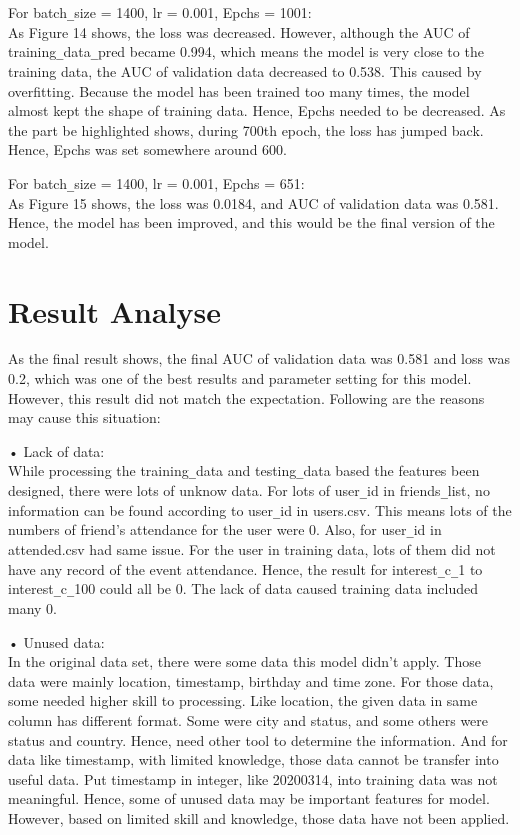 \documentclass{article}
\begin{document}
For batch\verb+_+size = 1400, lr = 0.001, Epchs = 1001:\\
As Figure 14 shows, the loss was decreased. However, although the AUC of training\verb+_+data\verb+_+pred became 0.994, which means the model is very close to the training data, the AUC of validation data decreased to 0.538. This caused by overfitting. Because the model has been trained too many times, the model almost kept the shape of training data. Hence, Epchs needed to be decreased. As the part be highlighted shows, during 700th epoch, the loss has jumped back. Hence, Epchs was set somewhere around 600.

For batch\verb+_+size = 1400, lr = 0.001, Epchs = 651:\\
As Figure 15 shows, the loss was 0.0184, and AUC of validation data was 0.581. Hence, the model has been improved, and this would be the final version of the model.

\section{Result Analyse}

As the final result shows, the final AUC of validation data was 0.581 and loss was 0.2, which was one of the best results and parameter setting for this model. However, this result did not match the expectation. Following are the reasons may cause this situation:

•	Lack of data:\\
	While processing the training\verb+_+data and testing\verb+_+data based the features been designed, there were lots of unknow data. For lots of user\verb+_+id in friends\verb+_+list, no information can be found according to user\verb+_+id in users.csv. This means lots of the numbers of friend’s attendance for the user were 0. Also, for user\verb+_+id in attended.csv had same issue. For the user in training data, lots of them did not have any record of the event attendance. Hence, the result for interest\verb+_+c\verb+_+1 to interest\verb+_+c\verb+_+100 could all be 0. The lack of data caused training data included many 0.
	
•	Unused data:\\
	In the original data set, there were some data this model didn’t apply. Those data were mainly location, timestamp, birthday and time zone. For those data, some needed higher skill to processing. Like location, the given data in same column has different format. Some were city and status, and some others were status and country. Hence, need other tool to determine the information. And for data like timestamp, with limited knowledge, those data cannot be transfer into useful data. Put timestamp in integer, like 20200314, into training data was not meaningful. Hence, some of unused data may be important features for model. However, based on limited skill and knowledge, those data have not been applied.
	
\end{document}
